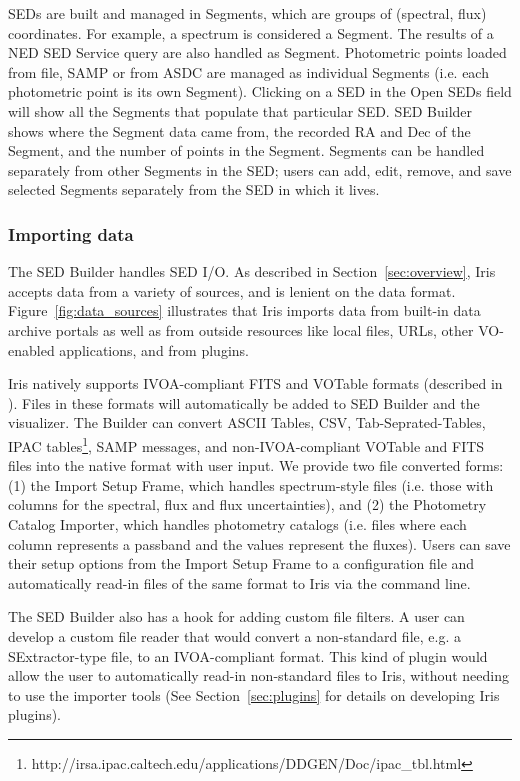 \documentclass[preprint,12pt,3p]{elsarticle}
\begin{document}
SEDs are built and managed in Segments, which are groups of (spectral, flux) coordinates. For example, a spectrum is considered a Segment. The results of a NED SED Service query are also handled as Segment. Photometric points loaded from file, SAMP or from ASDC are managed as individual Segments (i.e. each photometric point is its own Segment). Clicking on a SED in the Open SEDs field will show all the Segments that populate that particular SED. SED Builder shows where the Segment data came from, the recorded RA and Dec of the Segment, and the number of points in the Segment. Segments can be handled separately from other Segments in the SED; users can add, edit, remove, and save selected Segments separately from the SED in which it lives. 

\subsubsection{Importing data}
The SED Builder handles SED I/O. As described in Section~\ref{sec:overview}, Iris accepts data from a variety of sources, and is lenient on the data format. Figure~\ref{fig:data_sources} illustrates that Iris imports data from built-in data archive portals as well as from outside resources like local files, URLs, other VO-enabled applications, and from plugins.

Iris natively supports IVOA-compliant FITS and VOTable formats (described in \cite{2012arXiv1204.3055M}). Files in these formats will automatically be added to SED Builder and the visualizer. The Builder can convert ASCII Tables, CSV, Tab-Seprated-Tables, IPAC tables\footnote{http://irsa.ipac.caltech.edu/applications/DDGEN/Doc/ipac\_tbl.html}, SAMP messages, and non-IVOA-compliant VOTable and FITS files into the native format with user input. We provide two file converted forms: (1) the Import Setup Frame, which handles spectrum-style files (i.e. those with columns for the spectral, flux and flux uncertainties), and (2) the Photometry Catalog Importer, which handles photometry catalogs (i.e. files where each column represents a passband and the values represent the fluxes). Users can save their setup options from the Import Setup Frame to a configuration file and automatically read-in files of the same format to Iris via the command line.

The SED Builder also has a hook for adding custom file filters. A user can develop a custom file reader that would convert a non-standard file, e.g. a SExtractor-type file, to an IVOA-compliant format. This kind of plugin would allow the user to automatically read-in non-standard files to Iris, without needing to use the importer tools (See Section~\ref{sec:plugins} for details on developing Iris plugins).
\end{document}
